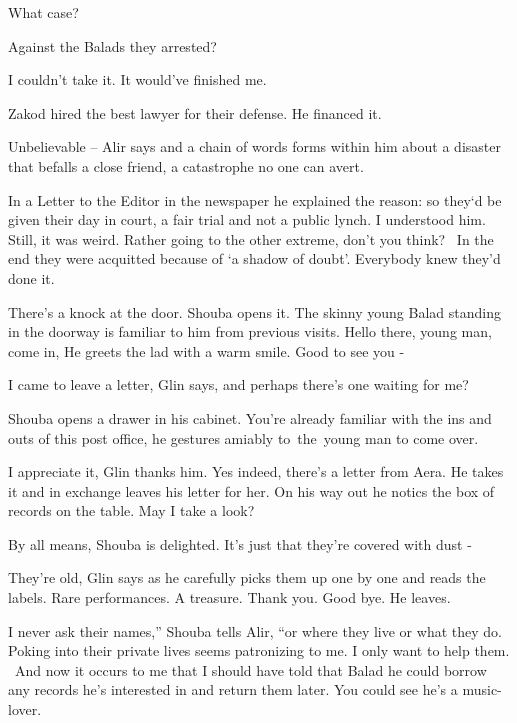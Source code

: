 \documentclass[letterpaper]{article}
\begin{document}
{\textquotedbl}What case?{\textquotedbl} 

{\textquotedbl}Against the Balads they arrested?{\textquotedbl} 

{\textquotedbl}I couldn't take it. It would've finished me.{\textquotedbl} 

{\textquotedbl}Zakod hired the best lawyer for their defense. He financed it.{\textquotedbl} 

{\textquotedbl}Unbelievable --{\textquotedbl} Alir says and a chain of words forms within him about a disaster that
befalls a close friend, a catastrophe no one can avert.

{\textquotedbl}In a Letter to the Editor in the newspaper he explained the reason: so they`d be given their day in
court, a fair trial and not a public lynch. I understood him. Still, it was weird. Rather going to the other extreme,
don't you think?\textcolor[rgb]{0.0,0.6901961,0.3137255}{ \ }In the end they were acquitted because of `a shadow of
doubt'. Everybody knew they'd done it.{\textquotedbl}

There's a knock at the door. Shouba opens it. The skinny young Balad standing in the doorway is familiar to him from
previous visits. {\textquotedbl}Hello there, young man, come in,{\textquotedbl} He greets the lad with a warm smile.
{\textquotedbl}Good to see you -{\textquotedbl} 

{\textquotedbl}I came to leave a letter,{\textquotedbl} Glin says, {\textquotedbl}and perhaps there's one waiting for
me?{\textquotedbl}

Shouba opens a drawer in his cabinet. {\textquotedbl}You're already familiar with the ins and outs of this post
office,{\textquotedbl} he gestures amiably to~the~young man to come over.

{\textquotedbl}I appreciate it,{\textquotedbl} Glin thanks him. Yes indeed, there's a letter from Aera. He takes it and
in exchange leaves his letter for her. On his way out he notics the box of records on the table. {\textquotedbl}May I
take a look?{\textquotedbl} 

{\textquotedbl}By all means,{\textquotedbl} Shouba is delighted. {\textquotedbl}It's just that they're covered with dust
-{\textquotedbl} 

{\textquotedbl}They're old,{\textquotedbl} Glin says as he carefully picks them up one by one and reads the labels.
{\textquotedbl}Rare performances. A treasure. Thank you. Good bye.{\textquotedbl} He leaves.

{\textquotedbl}I never ask their names,'' Shouba tells Alir, ``or where they live or what they do. Poking into their
private lives seems patronizing to me. I only want to help them. ~And now it occurs to me that I should have told that
Balad he could borrow any records he's interested in and return them later. You could see he's a
music-lover.{\textquotedbl} 
\end{document}
